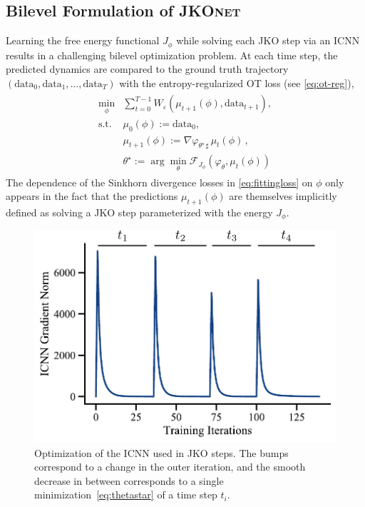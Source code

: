 \subsection{Bilevel Formulation of \textsc{JKOnet}}
Learning the free energy functional $J_\phi$ while solving each \acrshort{JKO} step via an ICNN results in a challenging bilevel optimization problem.
At each time step, the predicted dynamics are compared to the ground truth trajectory $(\mathrm{data}_0, \mathrm{data}_1, \dots, \mathrm{data}_T)$ with the entropy-regularized OT loss (see \ref{eq:ot-reg}),
\begin{align} \label{eq:fittingloss}
\begin{split}
    \min_\phi & \sum_{t=0}^{T-1} W_\varepsilon(\mu_{t+1}(\phi), \mathrm{data}_{t+1}), \\
    \text{s.t. } & \mu_{0}(\phi) := \mathrm{data}_0, \\
      & \mu_{t+1}(\phi) := \nabla \varphi_{\theta^\star\, \sharp}\, \mu_{t}(\phi)\,, \\
      & \theta^\star:=\arg \min_{\theta} \mathcal{F}_{J_{\phi}}(\varphi_{\theta},\mu_t(\phi))
\end{split}
\end{align}
The dependence of the Sinkhorn divergence losses in \eqref{eq:fittingloss} on $\phi$ only appears in the fact that the predictions $\mu_{t+1}(\phi)$ are themselves implicitly defined as solving a \acrshort{JKO} step parameterized with the energy $J_\phi$. 

\begin{figure}[t]
    \centering
    \includegraphics[width=.6\textwidth]{figures/fig_optimization_icnn.pdf}
    \caption{Optimization of the ICNN used in \acrshort{JKO} steps. The bumps correspond to a change in the outer iteration, and the smooth decrease in between corresponds to a single minimization~\eqref{eq:thetastar} of a time step $t_i$.}
    \label{fig:training_icnn}
\end{figure}

